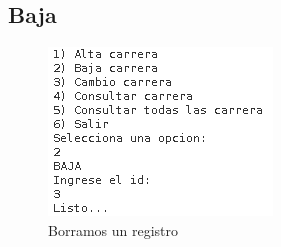 \documentclass[a4paper,12pt]{article}
\begin{document}
\subsection{Baja}
\begin{figure}[H]
\begin{center}
 \includegraphics[width=\textwidth]{baja.png}
 \caption{Borramos un registro}
 \label{fig:baja}
\end{center}
\end{figure}
\end{document}
